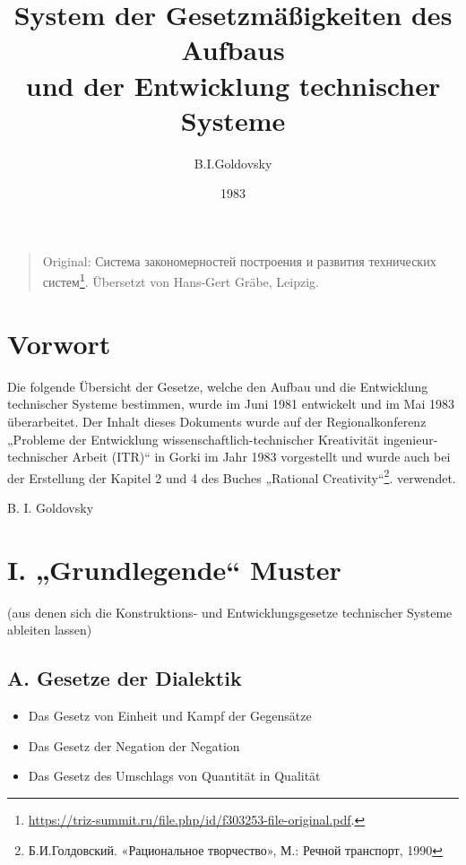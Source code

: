 \documentclass[11pt,a4paper]{article}
\title{System der Gesetzmäßigkeiten des Aufbaus\\ und der Entwicklung
  technischer Systeme }
\author{B.I.Goldovsky}
\date{1983}
\begin{document}
\maketitle
\begin{quote}
  Original: \foreignlanguage{russian}{Система закономерностей построения и
    развития технических
    систем}\footnote{\url{https://triz-summit.ru/file.php/id/f303253-file-original.pdf}.}.
  Übersetzt von Hans-Gert Gräbe, Leipzig.
\end{quote}

\section*{Vorwort}

Die folgende Übersicht der Gesetze, welche den Aufbau und die Entwicklung
technischer Systeme bestimmen, wurde im Juni 1981 entwickelt und im Mai 1983
überarbeitet. Der Inhalt dieses Dokuments wurde auf der Regionalkonferenz
„Probleme der Entwicklung wissenschaftlich-technischer Kreativität
ingenieur-technischer Arbeit (ITR)“ in Gorki im Jahr 1983 vorgestellt und
wurde auch bei der Erstellung der Kapitel 2 und 4 des Buches „Rational
Creativity“\footnote{\foreignlanguage{russian}{Б.И.Голдовский. «Рациональное
    творчество», М.: Речной транспорт, 1990}}. verwendet.

\begin{flushright}
  B. I. Goldovsky
\end{flushright}

\section*{I. „Grundlegende“ Muster}
(aus denen sich die Konstruktions- und Entwicklungsgesetze technischer Systeme
ableiten lassen) 
\subsection*{A. Gesetze der Dialektik}
\begin{itemize}\itemsep0pt
\item[1.1.] Das Gesetz von Einheit und Kampf der Gegensätze
\item[1.2.] Das Gesetz der Negation der Negation
\item[1.3.] Das Gesetz des Umschlags von Quantität in Qualität
\end{itemize}
\end{document}
